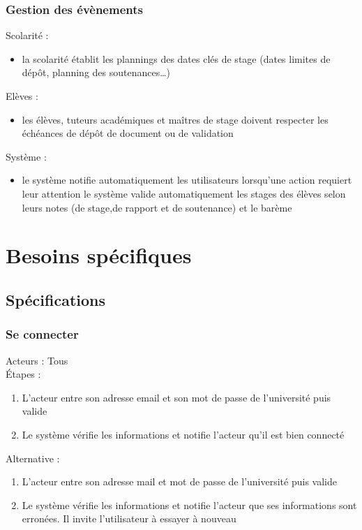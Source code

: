 \documentclass{scrreprt}
\begin{document}
\subsection{Gestion des \'ev\`enements}
Scolarit\'e :
\begin{itemize}
\item la scolarit\'e \'etablit les plannings des dates cl\'es de stage (dates limites de d\'ep\^ot, planning des soutenances…)
\end{itemize}

Elèves :
\begin{itemize}
\item les \'el\`eves, tuteurs acad\'emiques et ma\^itres de stage doivent respecter les \'ech\'eances de d\'ep\^ot de document ou de validation
\end{itemize}


Système :
\begin{itemize}
\item le syst\`eme notifie automatiquement les utilisateurs lorsqu’une action requiert leur attention
le syst\`eme valide automatiquement les stages des \'el\`eves selon leurs notes (de stage,de rapport et de soutenance) et le barème
\end{itemize}
\chapter{Besoins spécifiques}
\section{Sp\'ecifications}
\subsection{Se connecter}
Acteurs : Tous 
\\
\'Etapes :
\begin{enumerate}
\item L’acteur entre son adresse email et son mot de passe de l’universit\'e puis valide
\item Le syst\`eme v\'erifie les informations et notifie l’acteur qu’il est bien connect\'e
\end{enumerate} 
Alternative : 
\begin{enumerate}
\item L’acteur entre son adresse mail et mot de passe de l’universit\'e puis valide
\item Le syst\`eme v\'erifie les informations et notifie l’acteur que ses informations sont erron\'ees. Il invite l’utilisateur \`a essayer \`a nouveau
\end{enumerate}
\end{document}
